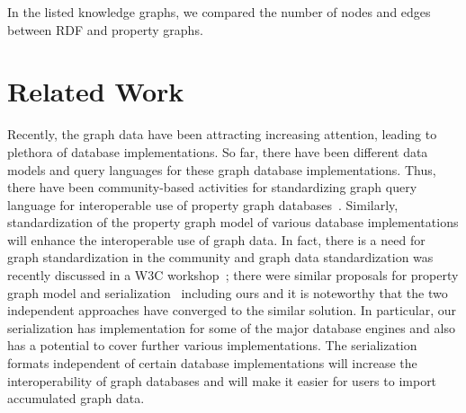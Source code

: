 \documentclass[runningheads]{llncs}
\begin{document}
In the listed knowledge graphs, we compared the number of nodes and edges between RDF and property graphs.

\section{Related Work}
Recently, the graph data have been attracting increasing attention, leading to plethora of database implementations. 
So far, there have been different data models and query languages for these graph database implementations.
Thus, there have been community-based activities for standardizing graph query language for interoperable use of property graph databases~\cite{angles3}. Similarly, standardization of the property graph model of various database implementations will enhance the interoperable use of graph data. In fact, there is a need for graph standardization in the community and graph data standardization was recently discussed in a W3C workshop~\cite{w3c}; there were similar proposals for property graph model and serialization~\cite{tomaszuk} including ours and it is noteworthy that the two independent approaches have converged to the similar solution. 
In particular, our serialization has implementation for some of the major database engines and also has a potential to cover further various implementations. %
The serialization formats independent of certain database implementations will increase the interoperability of graph databases and will make it easier for users to import accumulated graph data.
\end{document}
